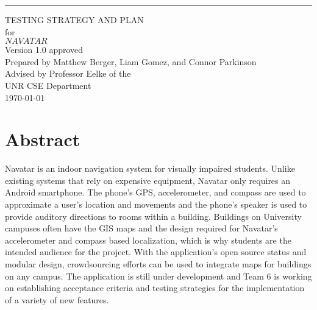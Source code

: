 \documentclass{scrreprt}
\date{}
\def\myversion{1.0 }
\begin{document}
\begin{flushright}
    \rule{16cm}{5pt}\vskip1cm
    \begin{bfseries}
        \Huge{TESTING STRATEGY AND PLAN}\\
        \vspace{1.6cm}
        for\\
        \vspace{1.6cm}
        $NAVATAR$\\
        \vspace{1.6cm}
        \LARGE{Version \myversion approved}\\
        \vspace{1.6cm}
        Prepared by Matthew Berger, Liam Gomez, and Connor Parkinson\\ 
        \vspace{1.6cm}
        Advised by Professor Eelke of the\\UNR CSE Department\\
        \vspace{1.6cm}
        \today\\
    \end{bfseries}
\end{flushright}

\tableofcontents

\chapter{Abstract}
Navatar is an indoor navigation system for visually impaired students. Unlike existing systems that rely on expensive equipment, Navatar only requires an Android smartphone. The phone’s GPS, accelerometer, and compass are used to approximate a user’s location and movements and the phone’s speaker is used to provide auditory directions to rooms within a building. Buildings on University campuses often have the GIS maps and the design required for Navatar’s accelerometer and compass based localization, which is why students are the intended audience for the project. With the application’s open source status and modular design, crowdsourcing efforts can be used to integrate maps for buildings on any campus. The application is still under development and Team 6 is working on establishing acceptance criteria and testing strategies for the implementation of a variety of new features.
\end{document}
